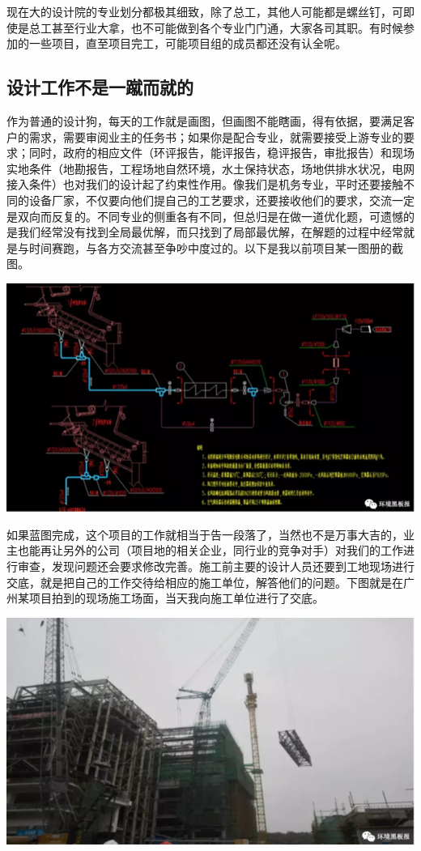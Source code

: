 \documentclass[
]{book}
\begin{document}
现在大的设计院的专业划分都极其细致，除了总工，其他人可能都是螺丝钉，可即使是总工甚至行业大拿，也不可能做到各个专业门门通，大家各司其职。有时候参加的一些项目，直至项目完工，可能项目组的成员都还没有认全呢。

\hypertarget{ux8bbeux8ba1ux5de5ux4f5cux4e0dux662fux4e00ux8e74ux800cux5c31ux7684}{%
\subsection{设计工作不是一蹴而就的}\label{ux8bbeux8ba1ux5de5ux4f5cux4e0dux662fux4e00ux8e74ux800cux5c31ux7684}}

作为普通的设计狗，每天的工作就是画图，但画图不能瞎画，得有依据，要满足客户的需求，需要审阅业主的任务书；如果你是配合专业，就需要接受上游专业的要求；同时，政府的相应文件（环评报告，能评报告，稳评报告，审批报告）和现场实地条件（地勘报告，工程场地自然环境，水土保持状态，场地供排水状况，电网接入条件）也对我们的设计起了约束性作用。像我们是机务专业，平时还要接触不同的设备厂家，不仅要向他们提自己的工艺要求，还要接收他们的要求，交流一定是双向而反复的。不同专业的侧重各有不同，但总归是在做一道优化题，可遗憾的是我们经常没有找到全局最优解，而只找到了局部最优解，在解题的过程中经常就是与时间赛跑，与各方交流甚至争吵中度过的。以下是我以前项目某一图册的截图。

\includegraphics[width=8.33in]{images/sisi2}

如果蓝图完成，这个项目的工作就相当于告一段落了，当然也不是万事大吉的，业主也能再让另外的公司（项目地的相关企业，同行业的竞争对手）对我们的工作进行审查，发现问题还会要求修改完善。施工前主要的设计人员还要到工地现场进行交底，就是把自己的工作交待给相应的施工单位，解答他们的问题。下图就是在广州某项目拍到的现场施工场面，当天我向施工单位进行了交底。

\includegraphics[width=8.33in]{images/sisi3}
\end{document}
